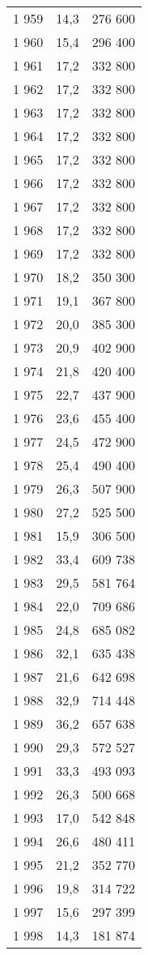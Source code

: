 \documentclass[french,11pt]{book}
\begin{document}
\begin{longtable}[t]{ccc}
1 959 & 14,3 & 276 600\\
1 960 & 15,4 & 296 400\\
1 961 & 17,2 & 332 800\\
1 962 & 17,2 & 332 800\\
1 963 & 17,2 & 332 800\\
1 964 & 17,2 & 332 800\\
1 965 & 17,2 & 332 800\\
1 966 & 17,2 & 332 800\\
1 967 & 17,2 & 332 800\\
1 968 & 17,2 & 332 800\\
1 969 & 17,2 & 332 800\\
1 970 & 18,2 & 350 300\\
1 971 & 19,1 & 367 800\\
1 972 & 20,0 & 385 300\\
1 973 & 20,9 & 402 900\\
1 974 & 21,8 & 420 400\\
1 975 & 22,7 & 437 900\\
1 976 & 23,6 & 455 400\\
1 977 & 24,5 & 472 900\\
1 978 & 25,4 & 490 400\\
1 979 & 26,3 & 507 900\\
1 980 & 27,2 & 525 500\\
1 981 & 15,9 & 306 500\\
1 982 & 33,4 & 609 738\\
1 983 & 29,5 & 581 764\\
1 984 & 22,0 & 709 686\\
1 985 & 24,8 & 685 082\\
1 986 & 32,1 & 635 438\\
1 987 & 21,6 & 642 698\\
1 988 & 32,9 & 714 448\\
1 989 & 36,2 & 657 638\\
1 990 & 29,3 & 572 527\\
1 991 & 33,3 & 493 093\\
1 992 & 26,3 & 500 668\\
1 993 & 17,0 & 542 848\\
1 994 & 26,6 & 480 411\\
1 995 & 21,2 & 352 770\\
1 996 & 19,8 & 314 722\\
1 997 & 15,6 & 297 399\\
1 998 & 14,3 & 181 874\\

\end{longtable}
\end{document}

